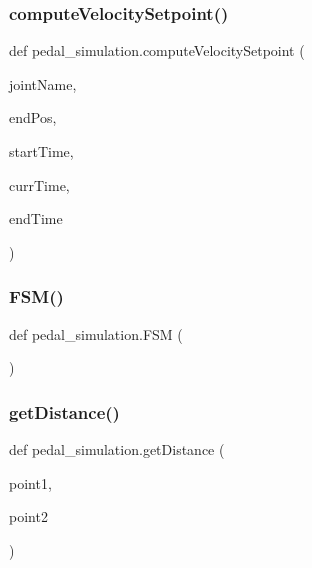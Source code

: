 \subsubsection{\texorpdfstring{computeVelocitySetpoint()}{computeVelocitySetpoint()}}
{\footnotesize\ttfamily def pedal\+\_\+simulation.\+compute\+Velocity\+Setpoint (\begin{DoxyParamCaption}\item[{}]{joint\+Name,  }\item[{}]{end\+Pos,  }\item[{}]{start\+Time,  }\item[{}]{curr\+Time,  }\item[{}]{end\+Time }\end{DoxyParamCaption})}

\mbox{\label{namespacepedal__simulation_a53867c33184116716ccf5ffc62619a39}} 
\subsubsection{\texorpdfstring{FSM()}{FSM()}}
{\footnotesize\ttfamily def pedal\+\_\+simulation.\+F\+SM (\begin{DoxyParamCaption}{ }\end{DoxyParamCaption})}

\mbox{\label{namespacepedal__simulation_a84cf351a6c446cfb26f97b6c5aeaeb59}} 
\subsubsection{\texorpdfstring{getDistance()}{getDistance()}}
{\footnotesize\ttfamily def pedal\+\_\+simulation.\+get\+Distance (\begin{DoxyParamCaption}\item[{}]{point1,  }\item[{}]{point2 }\end{DoxyParamCaption})}

\mbox{\label{namespacepedal__simulation_abb0ade1db3ccf525077ca1f2c59bc558}} 
